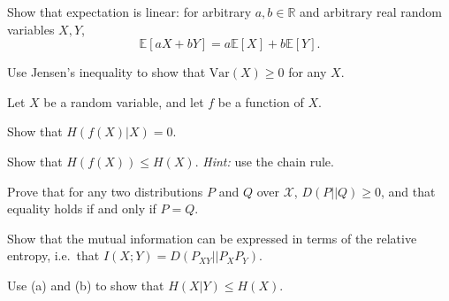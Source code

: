 \documentclass[a4paper,10pt,landscape,twocolumn]{scrartcl}
\begin{document}
\begin{exercise}[Variance (2pt)]
	\begin{subex}[(1pt)]
	Show that expectation is linear: for arbitrary $a,b \in \mathbb{R}$ and arbitrary real random variables $X,Y$,
	\[
	\mathbb{E}[aX + bY] = a\mathbb{E}[X] + b \mathbb{E}[Y].
	\]
	\end{subex}
	\begin{subex}[(1pt)]
	Use Jensen's inequality to show that $\mbox{Var}(X) \geq 0$ for any $X$.
	\end{subex}
\end{exercise}

\begin{exercise}
Let $X$ be a random variable, and let $f$ be a function of $X$.
	\begin{subex}[(1pt)]
	Show that $H(f(X) | X) = 0$.
	\end{subex}
	\begin{subex}[(2pt)]
	Show that $H(f(X)) \leq H(X)$. \emph{Hint:} use the chain rule.
	\end{subex}
\end{exercise}


\begin{exercise}
	\begin{subex}[(5pt)]
	Prove that for any two distributions $P$ and $Q$ over $\mathcal{X}$, $D(P||Q) \geq 0$, and that equality holds if and only if $P = Q$.
	\end{subex}
	\begin{subex}[(3pt)]
	Show that the mutual information can be expressed in terms of the relative entropy, i.e.\ that $I(X;Y) = D(P_{XY}||P_XP_Y)$.
	\end{subex}
	\begin{subex}[(1pt)]
	Use (a) and (b) to show that $H(X|Y) \leq H(X)$.
	\end{subex}
\end{exercise}
\end{document}
